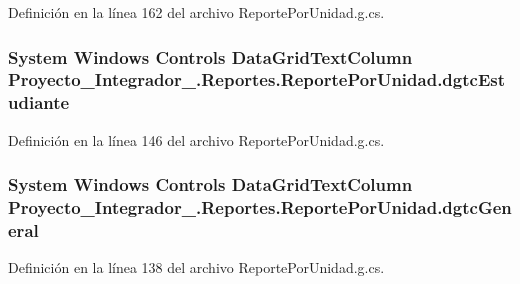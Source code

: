 Definición en la línea 162 del archivo Reporte\-Por\-Unidad.\-g.\-cs.

\hypertarget{class_proyecto___integrador__3_1_1_reportes_1_1_reporte_por_unidad_a544a15cf1c63259da29da75d20618a1d}{
\subsubsection[{dgtc\-Estudiante}]{\setlength{\rightskip}{0pt plus 5cm}System Windows Controls Data\-Grid\-Text\-Column Proyecto\-\_\-\-Integrador\-\_.\-Reportes.\-Reporte\-Por\-Unidad.\-dgtc\-Estudiante\hspace{0.3cm}{\ttfamily [package]}}}\label{class_proyecto___integrador__3_1_1_reportes_1_1_reporte_por_unidad_a544a15cf1c63259da29da75d20618a1d}


Definición en la línea 146 del archivo Reporte\-Por\-Unidad.\-g.\-cs.

\hypertarget{class_proyecto___integrador__3_1_1_reportes_1_1_reporte_por_unidad_a0f1d6ffbdedd1cb3d884f4a9468e6da4}{
\subsubsection[{dgtc\-General}]{\setlength{\rightskip}{0pt plus 5cm}System Windows Controls Data\-Grid\-Text\-Column Proyecto\-\_\-\-Integrador\-\_.\-Reportes.\-Reporte\-Por\-Unidad.\-dgtc\-General\hspace{0.3cm}{\ttfamily [package]}}}\label{class_proyecto___integrador__3_1_1_reportes_1_1_reporte_por_unidad_a0f1d6ffbdedd1cb3d884f4a9468e6da4}


Definición en la línea 138 del archivo Reporte\-Por\-Unidad.\-g.\-cs.

